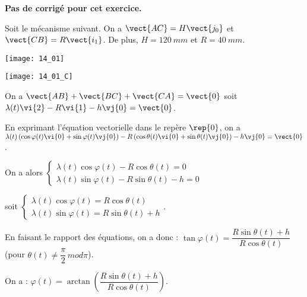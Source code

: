 \normaltrue \difficilefalse \tdifficilefalse
\correctiontrue


\setcounter{question}{0}
\ifcorrection
\else
\textbf{Pas de corrigé pour cet exercice.}
\fi

\ifprof
\else
Soit le mécanisme suivant. On a $\vect{AC}=H\vect{j_0}$ et $\vect{CB}=R\vect{i_1}$. De plus, 
$H=\SI{120}{mm}$ et $R=\SI{40}{mm}$. 

\begin{center}
\texttt{[image: 14\_01]}
\end{center}
\fi


\ifprof

\begin{center}
\texttt{[image: 14\_01\_C]}
\end{center}
\else
\fi

\ifprof
On a $\vect{AB}+\vect{BC}+\vect{CA}=\vect{0}$ soit 
$\lambda(t)\vi{2}-R\vi{1}-h\vj{0}=\vect{0}$.

En exprimant l'équation vectorielle dans le repère $\rep{0}$, on a 
$\lambda(t)\left( \cos\varphi(t)\vi{0}+\sin\varphi(t)\vj{0}\right)-R\left( \cos\theta(t)\vi{0}+\sin\theta(t)\vj{0}\right)-h\vj{0}=\vect{0}$.

On a alors 
$
\left\{
\begin{array}{l}
\lambda(t)\cos\varphi(t)-R \cos\theta(t)=0 \\
\lambda(t)\sin\varphi(t)-R\sin\theta(t)-h=0
\end{array}
\right.
$

soit 
$
\left\{
\begin{array}{l}
\lambda(t)\cos\varphi(t)=R \cos\theta(t) \\
\lambda(t)\sin\varphi(t)=R\sin\theta(t)+h
\end{array}
\right.
$.

En faisant le rapport des équations, on a donc : $\tan\varphi(t)=\dfrac{R\sin\theta(t)+h}{R \cos\theta(t)}$ (pour $\theta(t)\neq \dfrac{\pi}{2} \, mod \pi$).

\else
\fi

\ifprof
On a : $ \varphi(t)=\arctan \left( \dfrac{R\sin\theta(t)+h}{R \cos\theta(t)}\right)$.

